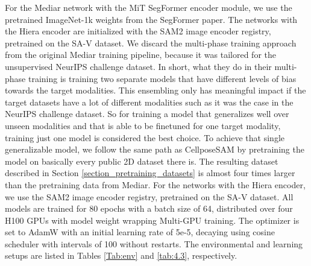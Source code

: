 For the Mediar network with the MiT SegFormer encoder module, we use the pretrained ImageNet-1k weights from the SegFormer paper. The networks with the Hiera encoder are initialized with the SAM2 image encoder registry, pretrained on the SA-V dataset. We discard the multi-phase training approach from the original Mediar training pipeline, because it was tailored for the unsupervised NeurIPS challenge dataset. In short, what they do in their multi-phase training is training two separate models that have different levels of bias towards the target modalities. This ensembling only has meaningful impact if the target datasets have a lot of different modalities such as it was the case in the NeurIPS challenge dataset. So for training a model that generalizes well over unseen modalities and that is able to be finetuned for one target modality, training just one model is considered the best choice. To achieve that single generalizable model, we follow the same path as CellposeSAM by pretraining the model on basically every public 2D dataset there is. The resulting dataset described in Section \ref{section_pretraining_datasets} is almost four times larger than the pretraining data from Mediar. For the networks with the Hiera encoder, we use the SAM2 image encoder registry, pretrained on the SA-V dataset.
All models are trained for 80 epochs with a batch size of 64, distributed over four H100 GPUs with model weight wrapping Multi-GPU training. The optimizer is set to AdamW with an initial learning rate of 5e-5, decaying using cosine scheduler with intervals of 100 without restarts. The environmental and learning setups are listed in Tables \ref{Tab:env} and \ref{tab:4.3}, respectively. 

